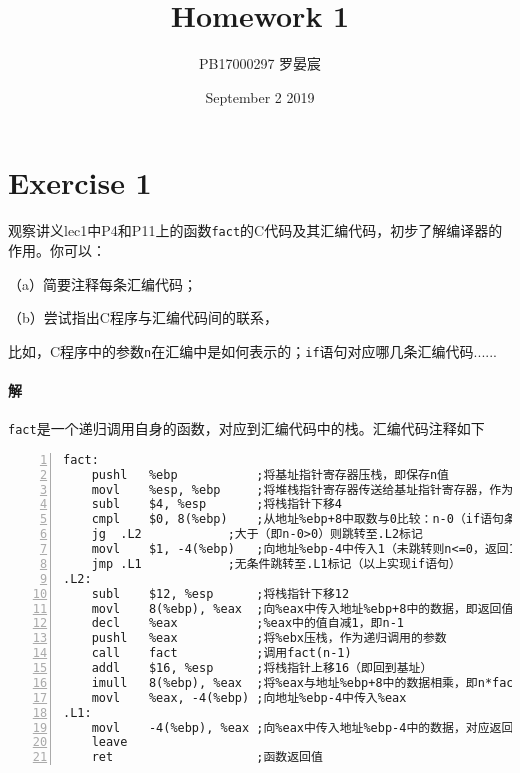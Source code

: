 \documentclass{article}
\title{Homework 1}
\author{PB17000297 罗晏宸}
\date{September 2 2019}
\begin{document}
\maketitle

\section{Exercise 1}
观察讲义lec1中P4和P11上的函数\texttt{fact}的C代码及其汇编代码，初步了解编译器的作用。你可以：\par
（a）简要注释每条汇编代码；\par
（b）尝试指出C程序与汇编代码间的联系，\par
比如，C程序中的参数\texttt{n}在汇编中是如何表示的；\texttt{if}语句对应哪几条汇编代码......
\\

\paragraph{解}
\texttt{fact}是一个递归调用自身的函数，对应到汇编代码中的栈。汇编代码注释如下
\begin{lstlisting}[language={[X86masm]Assembler}, 
         numbers=left, 
         numberstyle=\tiny,
         keywordstyle=\bfseries\color{blue!70},
         commentstyle=\small\color{red!40!green!60!blue},
         basicstyle=\small\ttfamily,
         escapeinside=``,
         breaklines=false,
         frame=lines]
fact:
	pushl	%ebp           ;将基址指针寄存器压栈，即保存n值
	movl	%esp, %ebp     ;将堆栈指针寄存器传送给基址指针寄存器，作为函数帧
	subl	$4, %esp       ;将栈指针下移4
	cmpl	$0, 8(%ebp)    ;从地址%ebp+8中取数与0比较：n-0（if语句条件）
	jg	.L2            ;大于（即n-0>0）则跳转至.L2标记
	movl	$1, -4(%ebp)   ;向地址%ebp-4中传入1（未跳转则n<=0，返回1）
	jmp	.L1            ;无条件跳转至.L1标记（以上实现if语句）
.L2:
	subl	$12, %esp      ;将栈指针下移12
	movl	8(%ebp), %eax  ;向%eax中传入地址%ebp+8中的数据，即返回值为n
	decl	%eax           ;%eax中的值自减1，即n-1
	pushl	%eax           ;将%ebx压栈，作为递归调用的参数
	call	fact           ;调用fact(n-1)
	addl	$16, %esp      ;将栈指针上移16（即回到基址）
	imull	8(%ebp), %eax  ;将%eax与地址%ebp+8中的数据相乘，即n*fact(n-1)
	movl	%eax, -4(%ebp) ;向地址%ebp-4中传入%eax
.L1:
	movl	-4(%ebp), %eax ;向%eax中传入地址%ebp-4中的数据，对应返回值
	leave
	ret                    ;函数返回值
\end{lstlisting}
\end{document}
